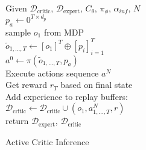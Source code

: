 \begin{algorithm}[H]
    \Require Given $\mathcal{D}_{\text{critic}}$, $\mathcal{D}_{\text{expert}}$,  
    $C_{\theta}$, $\pi_{\phi}$, $\alpha_{inf}$, $N$\\
    \State $p_a \gets 0^{T \times d_p}$ \hfill{} \\
    \State sample $o_1$ from MDP\\
    \State $\tilde{o}_{1, ..., T} \gets [o_1]^T \oplus [p_i]_{i=1}^T$ \hfill{} \\
    \State $a^0 \gets \pi(\tilde{o}_{1, ..., T}, p_a)$\hfill{} \\
    \State Execute actions sequence $a^N$\\
    \State Get reward $r_T$ based on final state\\
    \State Add experience to replay buffers:\\
    \State $\mathcal{D}_{\text{critic}} \gets \mathcal{D}_{\text{critic}} \cup (o_1, a^N_{1, ..., T}, r)$\\
    return $\mathcal{D}_{\text{expert}}$, $\mathcal{D}_{\text{critic}}$
    \caption{Active Critic Inference}
    \label{AC_Inference}

\end{algorithm}

